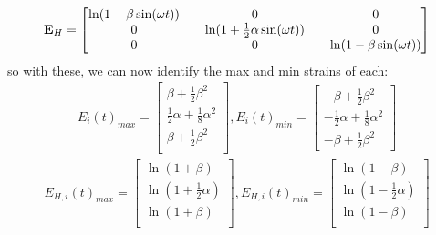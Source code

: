 \begin{gather}
    \mathbf{E}_H = 
    \begin{bmatrix}
         \ln(1-\beta\sin(\omega t)) && 0 && 0\\
        0 && \ln(1 + \frac{1}{2}\alpha\sin(\omega t)) && 0 \\
        0 && 0 && \ln(1-\beta\sin(\omega t))
    \end{bmatrix}
\end{gather}
so with these, we can now identify the max and min strains of each:
\begin{gather}
   \boxed{ E_i(t)_{max} = 
\begin{bmatrix}
    \beta+\frac{1}{2}\beta^2 \\
    \frac{1}{2}\alpha+ \frac{1}{8}\alpha^2 \\
    \beta+\frac{1}{2}\beta^2 \\
\end{bmatrix}}
,
 \boxed{E_i(t)_{min} = 
\begin{bmatrix}
    -\beta+\frac{1}{2}\beta^2 \\
    -\frac{1}{2}\alpha+ \frac{1}{8}\alpha^2 \\
    -\beta+\frac{1}{2}\beta^2
\end{bmatrix}}
\end{gather}
\begin{gather}
   \boxed{ E_{H,i}(t)_{max} = 
\begin{bmatrix}
    \ln(1+\beta)\\
    \ln(1+\frac{1}{2}\alpha) \\
    \ln(1+\beta)\\
\end{bmatrix}}
,
 \boxed{E_{H,i}(t)_{min} = 
\begin{bmatrix}
    \ln(1-\beta)\\
    \ln(1-\frac{1}{2}\alpha) \\
    \ln(1-\beta)\\
\end{bmatrix}}
\end{gather}
